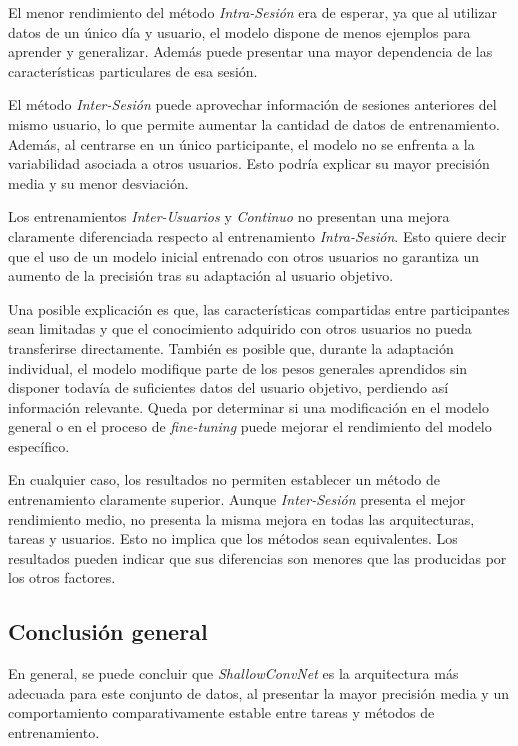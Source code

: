 El menor rendimiento del método \textit{Intra-Sesión} era de esperar, ya que al utilizar datos de un único día y usuario, el modelo dispone de menos ejemplos para aprender y generalizar. Además puede presentar una mayor dependencia de las características particulares de esa sesión.

El método \textit{Inter-Sesión} puede aprovechar información de sesiones anteriores del mismo usuario, lo que permite aumentar la cantidad de datos de entrenamiento. Además, al centrarse en un único participante, el modelo no se enfrenta a la variabilidad asociada a otros usuarios. Esto podría explicar su mayor precisión media y su menor desviación.

Los entrenamientos \textit{Inter-Usuarios} y \textit{Continuo} no presentan una mejora claramente diferenciada respecto al entrenamiento \textit{Intra-Sesión}. Esto quiere decir que el uso de un modelo inicial entrenado con otros usuarios no garantiza un aumento de la precisión tras su adaptación al usuario objetivo.

Una posible explicación es que, las características compartidas entre participantes sean limitadas y que el conocimiento adquirido con otros usuarios no pueda transferirse directamente. También es posible que, durante la adaptación individual, el modelo modifique parte de los pesos generales aprendidos sin disponer todavía de suficientes datos del usuario objetivo, perdiendo así información relevante. Queda por determinar si una modificación en el modelo general o en el proceso de \textit{fine-tuning} puede mejorar el rendimiento del modelo específico.

En cualquier caso, los resultados no permiten establecer un método de entrenamiento claramente superior. Aunque \textit{Inter-Sesión} presenta el mejor rendimiento medio, no presenta la misma mejora en todas las arquitecturas, tareas y usuarios. Esto no implica que los métodos sean equivalentes. Los resultados pueden indicar que sus diferencias son menores que las producidas por los otros factores.

\subsection{Conclusión general}

En general, se puede concluir que \textit{ShallowConvNet} es la arquitectura más adecuada para este conjunto de datos, al presentar la mayor precisión media y un comportamiento comparativamente estable entre tareas y métodos de entrenamiento.

